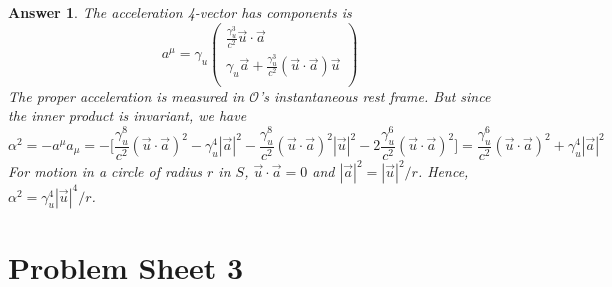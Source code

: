 \documentclass[a4paper]{article}
\theoremstyle{new2}
\newtheorem{ans}{Answer}[section]
\theoremstyle{new}
\begin{document}
\begin{ans}
The acceleration 4-vector has components is
$$a^\mu=\gamma_u\begin{pmatrix}\frac{\gamma_u^3}{c^2}\vec{u}\cdot\vec{a}\\\gamma_u\vec{a}+\frac{\gamma_u^3}{c^2}(\vec{u}\cdot\vec{a})\vec{u}\\\end{pmatrix}$$
The proper acceleration is measured in $\mathcal{O}$'s instantaneous rest frame. But since the inner product is invariant, we have
$$\alpha^2=-a^\mu a_\mu=-\bigg[\frac{\gamma_u^8}{c^2}(\vec{u}\cdot\vec{a})^2-\gamma_u^4|\vec{a}|^2-\frac{\gamma_u^8}{c^2}(\vec{u}\cdot\vec{a})^2|\vec{u}|^2-2\frac{\gamma_u^6}{c^2}(\vec{u}\cdot\vec{a})^2\bigg]=\frac{\gamma_u^6}{c^2}(\vec{u}\cdot\vec{a})^2+\gamma_u^4|\vec{a}|^2$$
For motion in a circle of radius $r$ in $S$, $\vec{u}\cdot\vec{a}=0$ and $|\vec{a}|^2=|\vec{u}|^2/r$. Hence, $\alpha^2=\gamma_u^4|\vec{u}|^4/r$.
\end{ans}
\newpage
\section{Problem Sheet 3}
\end{document}
